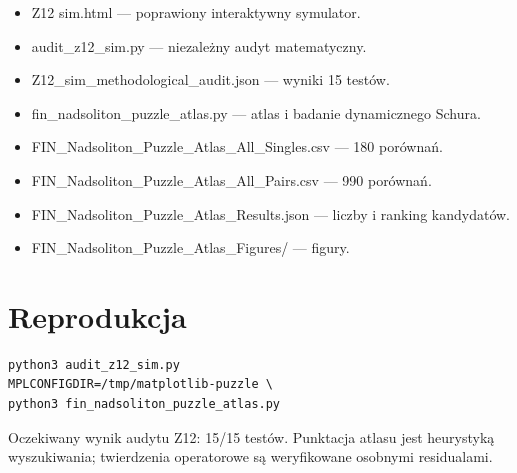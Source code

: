 \documentclass[11pt,a4paper,openany]{report}
\begin{document}
\begin{itemize}
\item 
Z12 sim.html --- poprawiony interaktywny symulator.

\item 
audit\_z12\_sim.py --- niezale\.zny audyt matematyczny.

\item 
Z12\_sim\_methodological\_audit.json --- wyniki 15 testów.

\item 
fin\_nadsoliton\_puzzle\_atlas.py --- atlas i badanie dynamicznego Schura.

\item 
FIN\_Nadsoliton\_Puzzle\_Atlas\_All\_Singles.csv --- 180 porównań.

\item 
FIN\_Nadsoliton\_Puzzle\_Atlas\_All\_Pairs.csv --- 990 porównań.

\item 
FIN\_Nadsoliton\_Puzzle\_Atlas\_Results.json --- liczby i ranking kandydatów.

\item 
FIN\_Nadsoliton\_Puzzle\_Atlas\_Figures/\allowbreak{} --- figury.

\end{itemize}


\clearpage
\chapter*{Reprodukcja}
\begin{Verbatim}[fontsize=\small]
python3 audit_z12_sim.py
MPLCONFIGDIR=/tmp/matplotlib-puzzle \
python3 fin_nadsoliton_puzzle_atlas.py
\end{Verbatim}
Oczekiwany wynik audytu Z12: 15/15 testów. Punktacja atlasu jest heurystyką
wyszukiwania; twierdzenia operatorowe są weryfikowane osobnymi residualami.
\end{document}
